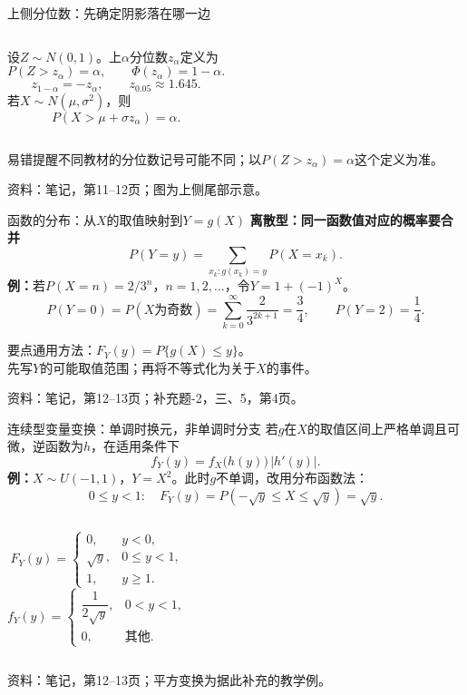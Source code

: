 \documentclass[aspectratio=169,10pt]{beamer}
\newcommand{\source}[1]{\vfill{\color{Muted}\fontsize{6.5}{8}\selectfont 资料：#1\par}}
\newcommand{\key}[1]{\begin{block}{要点}#1\end{block}}
\newcommand{\warn}[1]{\begin{alertblock}{易错提醒}#1\end{alertblock}}
\begin{document}
\begin{frame}[t]{上侧分位数：先确定阴影落在哪一边}
\begin{columns}[c]
设$Z\sim N(0,1)$。上$\alpha$分位数$z_\alpha$定义为
\[
P(Z>z_\alpha)=\alpha,\qquad \Phi(z_\alpha)=1-\alpha.
\]
\[
z_{1-\alpha}=-z_\alpha,\qquad z_{0.05}\approx1.645.
\]
若$X\sim N(\mu,\sigma^2)$，则
\[
P(X>\mu+\sigma z_\alpha)=\alpha.
\]
\end{columns}
\warn{不同教材的分位数记号可能不同；以$P(Z>z_\alpha)=\alpha$这个定义为准。}
\source{笔记，第11--12页；图为上侧尾部示意。}
\end{frame}

\begin{frame}[t]{函数的分布：从$X$的取值映射到$Y=g(X)$}
\textbf{离散型：同一函数值对应的概率要合并}
\[
P(Y=y)=\sum_{x_k:g(x_k)=y}P(X=x_k).
\]
\textbf{例：}若$P(X=n)=2/3^n$，$n=1,2,\ldots$，令$Y=1+(-1)^X$。
\[
P(Y=0)=P(X\text{为奇数})=\sum_{k=0}^{\infty}\frac2{3^{2k+1}}=\frac34,
\qquad P(Y=2)=\frac14.
\]
\key{通用方法：$F_Y(y)=P\{g(X)\le y\}$。\\
先写$Y$的可能取值范围；再将不等式化为关于$X$的事件。}
\source{笔记，第12--13页；补充题-2，三、5，第4页。}
\end{frame}

\begin{frame}[t]{连续型变量变换：单调时换元，非单调时分支}
若$g$在$X$的取值区间上严格单调且可微，逆函数为$h$，在适用条件下
\[
\boxed{f_Y(y)=f_X\!\bigl(h(y)\bigr)\,|h'(y)|}.
\]
\textbf{例：}$X\sim U(-1,1)$，$Y=X^2$。此时$g$不单调，改用分布函数法：
\[
0\le y<1:\quad F_Y(y)=P(-\sqrt y\le X\le\sqrt y)=\sqrt y.
\]
\begin{columns}[T]
\[
F_Y(y)=\begin{cases}0,&y<0,\\\sqrt y,&0\le y<1,\\1,&y\ge1.\end{cases}
\]
\[
f_Y(y)=\begin{cases}\dfrac1{2\sqrt y},&0<y<1,\\0,&\text{其他}.\end{cases}
\]
\end{columns}
\source{笔记，第12--13页；平方变换为据此补充的教学例。}
\end{frame}
\end{document}
